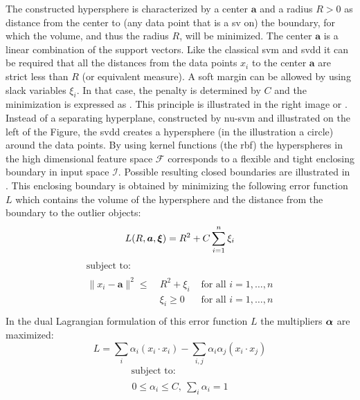 The constructed hypersphere is characterized by a center $\mathbf{a}$ and a radius $R > 0$ as distance from the center to (any data point that is a \gls{sv} on) the boundary, for which the volume, and thus the radius $R$, will be minimized.
The center $\mathbf{a}$ is a linear combination of the support vectors.
Like the classical \gls{svm} and \gls{svdd} it can be required that all the distances from the data points $x_i$ to the center $\mathbf{a}$ are strict less than $R$ (or equivalent measure).
A soft margin can be allowed by using slack variables $\xi_i$.
In that case, the penalty is determined by $C$ and the minimization is expressed as .
This principle is illustrated in the right image or .
Instead of a separating hyperplane, constructed by \gls{nu-svm} and illustrated on the left of the Figure, the \gls{svdd} creates a hypersphere (in the illustration a circle) around the data points.
By using kernel functions (\eg the \gls{rbf}) the hyperspheres in the high dimensional feature space $\mathcal{F}$ corresponds to a flexible and tight enclosing boundary in input space $\mathcal{I}$.
Possible resulting closed boundaries are illustrated in .
This enclosing boundary is obtained by minimizing the following error function $L$ which contains the volume of the hypersphere and the distance from the boundary to the outlier objects:
\begin{equation}\label{eq:svdd_objective}
  L(R, \vectorsym{a}, \vectorsym{\xi}) = R^2 + C \sum_{i=1}^n \xi_i
\end{equation}
\begin{equation}
  \begin{multlined}
    \mbox{ subject to: } \\
    \begin{aligned}
      \lVert x_i - \mathbf{a} \rVert ^ 2 \leq \: & R^2 + \xi_i & \mbox{ for all } i = 1, \dots, n \\
      & \xi_i \geq 0 & \mbox{ for all } i = 1, \dots, n \\
    \end{aligned}
  \end{multlined}
\end{equation}
In the dual Lagrangian formulation of this error function $L$ the multipliers $\vectorsym{\alpha}$ are maximized:
\begin{equation}\label{eq:svdd_lagrange}
  L = \sum_{i} \alpha_i(x_i \cdot x_i) - \sum_{i,j} \alpha_i \alpha_j(x_i \cdot x_j)
\end{equation}
\begin{equation}
  \begin{multlined}
    \mbox{ subject to: } \\
    \begin{aligned}
    0 \le \alpha_i \le C, \: \sum_{i} \alpha_i = 1
    \end{aligned}
  \end{multlined}
\end{equation}

